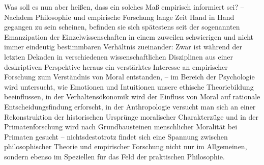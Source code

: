 \documentclass[a4paper]{thesis}
\begin{document}
Was soll es nun aber heißen, dass ein solches Maß empirisch informiert sei? – Nachdem Philosophie und empirische Forschung lange Zeit Hand in Hand gegangen zu sein scheinen, befinden sie sich spätestens seit der sogenannten Emanzipation der Einzelwissenschaften in einem zuweilen schwierigen und nicht immer eindeutig bestimmbaren Verhältnis zueinander: Zwar ist während der letzten Dekaden in verschiedenen wissenschaftlichen Disziplinen aus einer deskriptiven Perspektive heraus ein verstärktes Interesse an empirischer Forschung zum Verständnis von Moral entstanden, -- im Bereich der Psychologie wird untersucht, wie Emotionen und Intuitionen unsere ethische Theoriebildung beeinflussen, in der Verhaltensökonomik wird der Einfluss von Moral auf rationale Entscheidungsfindung erforscht, in der Anthropologie versucht man sich an einer Rekonstruktion der historischen Ursprünge moralischer Charakterzüge und in der Primatenforschung wird nach Grundbausteinen menschlicher Moralität bei Primaten gesucht -- nichtsdestotrotz findet sich eine Spannung zwischen philosophischer Theorie und empirischer Forschung nicht nur im Allgemeinen, sondern ebenso im Speziellen für das Feld der praktischen Philosophie.
\end{document}
